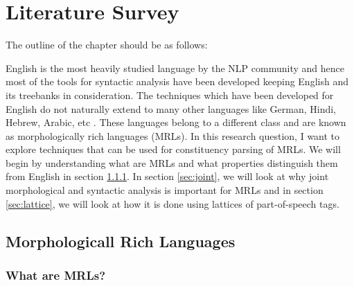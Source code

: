 \chapter{Literature Survey}

The outline of the chapter should be as follows:


English is the most heavily studied language by the NLP community and hence most of the tools for syntactic analysis have been developed keeping English and its treebanks in consideration. The techniques which have been developed for English do not naturally extend to many other languages like German, Hindi, Hebrew, Arabic, etc \cite{tsarfaty2010statistical}. These languages belong to a different class and are known as morphologically rich languages (MRLs). In this research question, I want to explore techniques that can be used for constituency parsing of MRLs. We will begin by understanding what are MRLs and what properties distinguish them from English in section \ref{sec:mrl}. In section \ref{sec:joint}, we will look at why joint morphological and syntactic analysis is important for MRLs and in section \ref{sec:lattice}, we will look at how it is done using lattices of part-of-speech tags.

\section{Morphologicall Rich Languages}
\subsection{What are MRLs?}
\label{sec:mrl}

